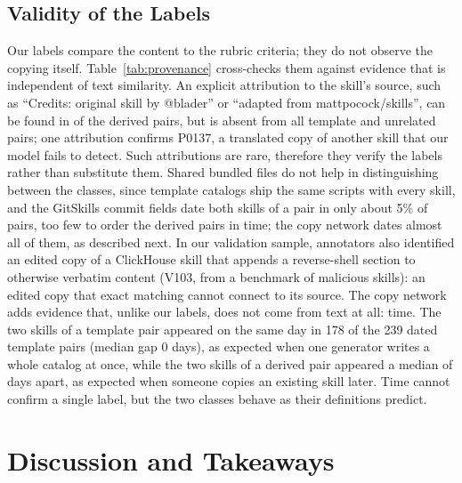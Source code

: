 \documentclass[sigconf,screen]{acmart}
\begin{document}
\subsection{Validity of the Labels}
\label{sec:labelvalidity}
Our labels compare the content to the rubric criteria; they do not observe the copying itself. Table~\ref{tab:provenance} cross-checks them against evidence that is independent of text similarity. An explicit attribution to the skill's source, such as ``Credits: original skill by @blader'' or ``adapted from mattpocock/skills'', can be found in \ResProvAttributionDerived{} of the derived pairs, but is absent from all template and unrelated pairs; one attribution confirms P0137, a translated copy of another skill that our model fails to detect. Such attributions are rare, therefore they verify the labels rather than substitute them. Shared bundled files do not help in distinguishing between the classes, since template catalogs ship the same scripts with every skill, and the GitSkills commit fields date both skills of a pair in only about 5\% of pairs, too few to order the derived pairs in time; the copy network dates almost all of them, as described next. In our validation sample, annotators also identified an edited copy of a ClickHouse skill that appends a reverse-shell section to otherwise verbatim content (V103, from a benchmark of malicious skills): an edited copy that exact matching cannot connect to its source. The copy network adds evidence that, unlike our labels, does not come from text at all: time. The two skills of a template pair appeared on the same day in 178 of the 239 dated template pairs (median gap 0 days), as expected when one generator writes a whole catalog at once, while the two skills of a derived pair appeared a median of \ResCNGoldMedianGapDays{} days apart, as expected when someone copies an existing skill later. Time cannot confirm a single label, but the two classes behave as their definitions predict.

\begin{table}[t]
\caption{Provenance evidence per gold-set class.}
\label{tab:provenance}
\small
{}
\end{table}


\section{Discussion and Takeaways}
\label{sec:takeaways}
 
\end{document}
